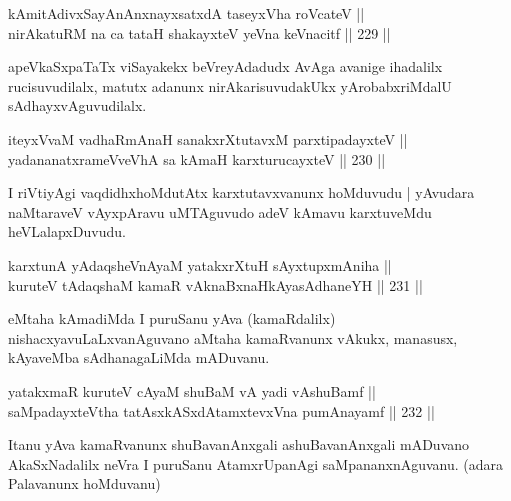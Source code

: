 \begin{shl}
kAmitAdivxSayAnAnxnayxsatxdA taseyxVha roVcateV || \\
nirAkatuRM na ca tataH shakayxteV yeVna keVnacitf \hfill || 229 ||  
\end{shl}

\begin{artha}
apeVkaSxpaTaTx viSayakekx beVreyAdadudx AvAga avanige ihadalilx
rucisuvudilalx, matutx adanunx nirAkarisuvudakUkx yArobabxriMdalU
sAdhayxvAguvudilalx.
\end{artha}

\begin{shl}
iteyxVvaM vadhaRmAnaH sana\footnotemark[1]kxrXtutavxM parxtipadayxteV || \\
yadananatxrameVveVhA sa kAmaH karxturucayxteV \hfill || 230 ||  
\end{shl}

\begin{artha}
I riVtiyAgi vaqdidhxhoMdutAtx karxtutavxvanunx hoMduvudu | yAvudara
naMtaraveV vAyxpAravu uMTAguvudo adeV kAmavu karxtuveMdu heVLalapxDuvudu.
\end{artha}


\begin{shl}
karxtunA yAdaqsheVnAyaM yatakxrXtuH sAyxtupxmAniha || \\
kuruteV tAdaqshaM kamaR vAknaBxnaHkAyasAdhaneYH \hfill || 231 || 
\end{shl}

\begin{artha}
eMtaha kAmadiMda I puruSanu yAva (kamaRdalilx)
nishacxyavuLaLxvanAguvano aMtaha kamaRvanunx vAkukx, manasusx,
kAyaveMba sAdhanagaLiMda mADuvanu.
\end{artha}

\begin{shl}
yatakxmaR kuruteV cAyaM shuBaM vA yadi vA\s shuBamf || \\
saMpadayxteV\s tha tatAsxkASxdAtamxtevxVna pumAnayamf \hfill || 232 ||  
\end{shl}

\begin{artha}
Itanu yAva kamaRvanunx shuBavanAnxgali ashuBavanAnxgali mADuvano
AkaSxNadalilx neVra I puruSanu AtamxrUpanAgi saMpananxnAguvanu.
(adara Palavanunx hoMduvanu) 
\end{artha}

